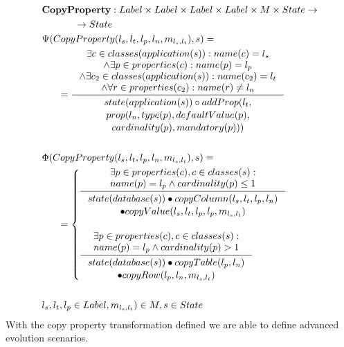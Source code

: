 \documentclass[11pt]{article}
\begin{document}
\begin{align*}
&	\mathbf{CopyProperty} : Label \times Label \times Label \times Label \times M \times State \rightarrow \\ &\;\;\;\;\;\; \;\;\;\;\;\;  \rightarrow State \\
&	\Psi(CopyProperty(l_s, l_t, l_p, l_n, m_{l_s, l_t}), s) = \\
& \;\;\;\;\;\; = \inference{\exists c \in classes(application(s)) : name(c) = l_s \\ \wedge \exists p \in properties(c) : name(p) = l_p \\ \wedge \exists c_2 \in classes(application(s)): name(c_2) = l_t \\
\wedge \forall r \in properties(c_2): name(r) \neq l_n}{\begin{gathered}
 state(application(s)) \circ addProp(l_t, \\ prop(l_n, type(p), defaultValue(p), \\ cardinality(p), mandatory(p)))
\end{gathered}
} 
	\\\\
&	\Phi(CopyProperty(l_s, l_t, l_p, l_n, m_{l_s, l_t}), s) = \\
& \;\;\;\;\;\; = \begin{cases}
		\inference{\exists p \in properties(c), c \in classes(s) : \\ name(p) = l_p \wedge cardinality(p) \leq 1 }{\begin{gathered}
			state(database(s)) \bullet copyColumn(l_s, l_t, l_p, l_n) \\ \bullet copyValue(l_s, l_t, l_p, l_p, m_{l_s, l_t}) 
			\end{gathered}} \\ \\
		\inference{\exists p \in properties(c), c \in classes(s) : \\ name(p) = l_p \wedge cardinality(p) > 1}{\begin{gathered}
			state(database(s)) \bullet copyTable(l_p, l_n) \\ \bullet copyRow(l_p, l_n, m_{l_s, l_t}) 
			\end{gathered}}
 \end{cases}\\\\
& l_s, l_t, l_p \in Label,  m_{l_s, l_t}) \in M, s \in State
\end{align*}
With the copy property transformation defined we are able to define advanced evolution scenarios.
\end{document}
